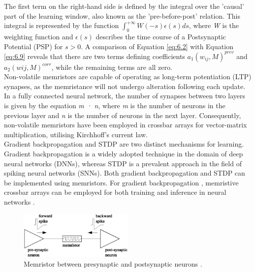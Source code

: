 \noindent The first term on the right-hand side is defined by the integral over the 'causal' part of the learning window, also known as the 'pre-before-post' relation. This integral is represented by the function $\int_{0}^{+\infty } W(-s)\epsilon(s)ds$, where \textit{W} is the weighting function and $\epsilon (s)$ describes the time course of a Postsynaptic Potential (PSP) for $s > 0$. A comparison of Equation \ref{eq:6.2} with Equation \ref{eq:6.9} reveals that there are two terms defining coefficients $a_1(w_{ij},M)^{prev}$ and $a_2(wij,M)^{corr}$, while the remaining terms are all zero. \\

\noindent Non-volatile memristors are capable of operating as long-term potentiation (LTP) synapses, as the memristance will not undergo alteration following each update. In a fully connected neural network, the number of synapses between two layers is given by the equation \textit{m · n}, where \textit{m} is the number of neurons in the previous layer and \textit{n} is the number of neurons in the next layer. Consequently, non-volatile memristors have been employed in crossbar arrays for vector-matrix multiplication, utilising Kirchhoff's current law. \\


\noindent Gradient backpropagation and STDP are two distinct mechanisms for learning. Gradient backpropagation is a widely adopted technique in the domain of deep neural networks (DNNs), whereas STDP is a prevalent approach in the field of spiking neural networks (SNNs). Both gradient backpropagation and STDP can be implemented using memristors. For gradient backpropagation \cite{hasan2017chip}, memristive crossbar arrays can be employed for both training and inference in neural networks \cite{ankit2019puma}.\\


\begin{figure}[htbp!] 
    \centering    
    \includegraphics[width=0.5\textwidth]{Chapter6/Figs/d.png}
    \caption[Memristor between presynaptic and postsynaptic neurons.]{Memristor between presynaptic and postsynaptic neurons \cite{huang2018memristor}.}
    \label{fig:6d}
\end{figure}

